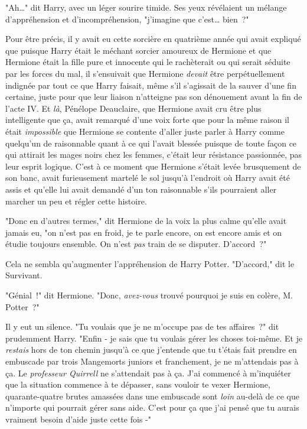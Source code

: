 "Ah…" dit Harry, avec un léger sourire timide. Ses yeux révélaient un mélange d'appréhension et d'incompréhension, "j'imagine que c'est… bien~?"

Pour être précis, il y avait eu cette sorcière en quatrième année qui avait expliqué que puisque Harry était le méchant sorcier amoureux de Hermione et que Hermione était la fille pure et innocente qui le rachèterait ou qui serait séduite par les forces du mal, il s'ensuivait que Hermione \emph{devait} être perpétuellement indignée par tout ce que Harry faisait, même s'il s'agissait de la sauver d'une fin certaine, juste pour que leur liaison n'atteigne pas son dénouement avant la fin de l'acte IV. Et \emph{là}, Pénélope Deauclaire, que Hermione avait cru être plus intelligente que ça, avait remarqué d'une voix forte que pour la même raison il était \emph{impossible} que Hermione se contente d'aller juste parler à Harry comme quelqu'un de raisonnable quant à ce qui l'avait blessée puisque de toute façon ce qui attirait les mages noirs chez les femmes, c'était leur résistance passionnée, pas leur esprit logique. C'est à ce moment que Hermione s'était levée brusquement de son banc, avait furieusement martelé le sol jusqu'à l'endroit où Harry avait été assis et qu'elle lui avait demandé d'un ton raisonnable s'ils pourraient aller marcher un peu et régler cette histoire.

"Donc en d'autres termes," dit Hermione de la voix la plus calme qu'elle avait jamais eu, "on n'est pas en froid, je te parle encore, on est encore amis et on étudie toujours ensemble. On n'est \emph{pas} train de se disputer. D'accord~?"

Cela ne sembla qu'augmenter l'appréhension de Harry Potter. "D'accord," dit le Survivant.

"Génial~!" dit Hermione. "Donc, \emph{avez-vous} trouvé pourquoi je suis en colère, M. Potter~?"

Il y eut un silence. "Tu voulais que je ne m'occupe pas de tes affaires~?" dit prudemment Harry. "Enfin - je sais que tu voulais gérer les choses toi-même. Et je \emph{restais} hors de ton chemin jusqu'à ce que j'entende que tu t'étais fait prendre en embuscade par trois Mangemorts juniors et franchement, je ne m'attendais pas à ça. Le \emph{professeur Quirrell} ne s'attendait pas à ça. J'ai commencé à m'inquiéter que la situation commence à te dépasser, sans vouloir te vexer Hermione, quarante-quatre brutes amassées dans une embuscade sont \emph{loin} au-delà de ce que n'importe qui pourrait gérer sans aide. C'est pour ça que j'ai pensé que tu aurais vraiment besoin d'aide juste cette fois -"

